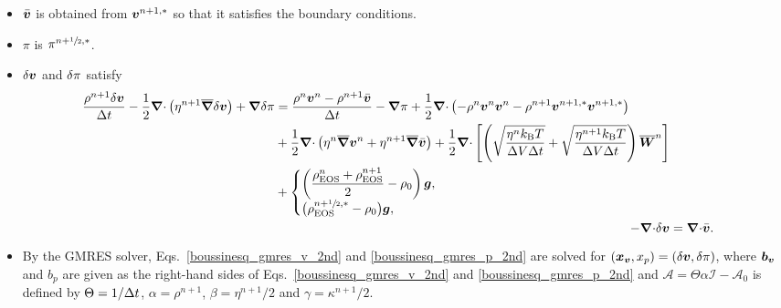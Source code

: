 \documentclass[
10pt
showpacs, showkeys,
amsmath,amssymb,
aps,
pre,
floatfix,
]{revtex4-1}
\newcommand{\divg}{{\V\nabla\cdot}}                       %
\begin{document}
\begin{enumerate}
\begin{itemize}
\item $\bar{\boldsymbol{v}}$ is obtained from $\boldsymbol{v}^{n+1,*}$ so that it satisfies the boundary conditions.
\item $\pi$ is $\pi^{n+\sfrac{1}{2},*}$.
\item $\delta\boldsymbol{v}$ and $\delta\pi$ satisfy
\begin{align}
\label{boussinesq_gmres_v_2nd}
\begin{split}
\frac{\rho^{n+1}\d{\V{v}}}{\D{t}} - \frac{1}{2}\divg\left(\eta^{n+1}\overline{\grad}\d{\V{v}}\right) + \grad\d{\pi}
& = \frac{\rho^n\V{v}^n-\rho^{n+1}\bar{\V{v}}}{\D{t}} - \grad\pi 
+ \frac{1}{2}\divg\left(-\rho^n\V{v}^n\V{v}^n-\rho^{n+1}\V{v}^{n+1,*}\V{v}^{n+1,*}\right) \\
& + \frac{1}{2}\divg\left( \eta^n\overline{\grad}\V{v}^n + \eta^{n+1}\overline{\grad}\bar{\V{v}} \right) 
+ \frac{1}{2}\divg\left[\left( \sqrt{\frac{\eta^n k_\mathrm{B}T}{\D{V}\D{t}}} + \sqrt{\frac{\eta^{n+1} k_\mathrm{B}T}{\D{V}\D{t}}} \right) \overline{\V{W}}^n \right] \\
& +
\begin{cases}
\displaystyle \left(\frac{\rho^n_\mathrm{EOS}+\rho^{n+1}_\mathrm{EOS}}{2}-\rho_0\right)\V{g}, \\
\big(\rho^{n+\myhalf,*}_\mathrm{EOS}-\rho_0\big)\V{g}, 
\end{cases}
\end{split} \\
\label{boussinesq_gmres_p_2nd}
-\divg\d{\V{v}} &= \divg\bar{\V{v}}.
\end{align}
\item By the GMRES solver, Eqs.~\eqref{boussinesq_gmres_v_2nd} and \eqref{boussinesq_gmres_p_2nd} are solved for $(\boldsymbol{x}_{\boldsymbol{v}},x_p)=(\delta\boldsymbol{v},\delta\pi)$, where $\boldsymbol{b}_{\boldsymbol{v}}$ and $b_p$ are given as the right-hand sides of Eqs.~\eqref{boussinesq_gmres_v_2nd} and \eqref{boussinesq_gmres_p_2nd} and $\mathcal{A}=\Theta\alpha\mathcal{I}-\mathcal{A}_0$ is defined by $\Theta=1/\Delta t$, $\alpha=\rho^{n+1}$, $\beta=\eta^{n+1}/2$ and $\gamma=\kappa^{n+1}/2$.
\end{itemize}

\end{enumerate}
\end{document}
